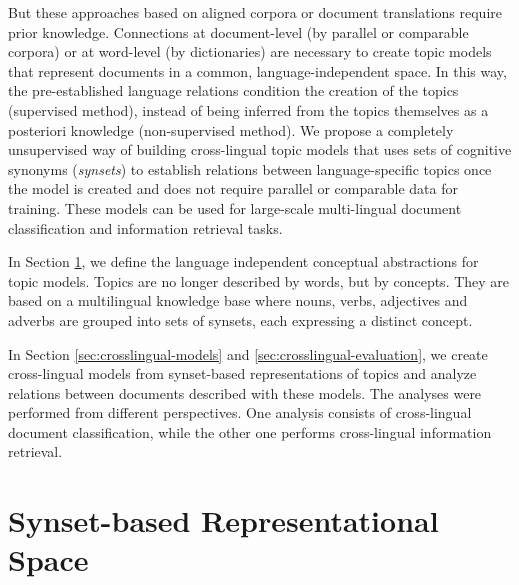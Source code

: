 But these approaches based on aligned corpora or document translations require prior knowledge. Connections at document-level (by parallel or comparable corpora) or at word-level (by dictionaries) are necessary to create topic models that represent documents in a common, language-independent space. In this way, the pre-established language relations condition the creation of the topics (supervised method), instead of being inferred from the topics themselves as a posteriori knowledge (non-supervised method). We propose a completely unsupervised way of building cross-lingual topic models that uses sets of cognitive synonyms (\textit{synsets}) to establish relations between language-specific topics once the model is created and does not require parallel or comparable data for training. These models can be used for large-scale multi-lingual document classification and information retrieval tasks.

In Section \ref{sec:synset-space}, we define the language independent conceptual abstractions for topic models. Topics are no longer described by words, but by concepts. They are based on a multilingual knowledge base where nouns, verbs, adjectives and adverbs are grouped into sets of synsets, each expressing a distinct concept. 

In Section \ref{sec:crosslingual-models} and \ref{sec:crosslingual-evaluation}, we create cross-lingual models from synset-based representations of topics and analyze relations between documents described with these models. The analyses were performed from different perspectives. One analysis consists of cross-lingual document classification, while the other one performs cross-lingual information retrieval.

\section{Synset-based Representational Space}
\label{sec:synset-space}

